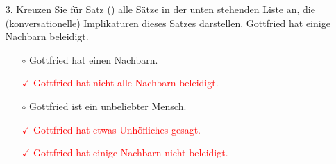 {\begin{frame}
\begin{enumerate}
\end{enumerate}

\end{frame}


\begin{frame}

\begin{enumerate}
\item[3.] Kreuzen Sie für Satz () alle Sätze in der unten stehenden Liste an, die (konversationelle) Implikaturen dieses Satzes darstellen.
\ea
Gottfried hat einige Nachbarn beleidigt.
\z 
\begin{itemize}
	\item[$\circ$] Gottfried hat einen Nachbarn.
	\item[\textcolor{red}{$\checkmark$}] \textcolor{red}{Gottfried hat nicht alle Nachbarn beleidigt.}
	\item[$\circ$] Gottfried ist ein unbeliebter Mensch.
	\item[\textcolor{red}{$\checkmark$}] \textcolor{red}{Gottfried hat etwas Unhöfliches gesagt.}
	\item[\textcolor{red}{$\checkmark$}] \textcolor{red}{Gottfried hat einige Nachbarn nicht beleidigt.}
\end{itemize}

\end{enumerate}

\end{frame}

}{
%
}

